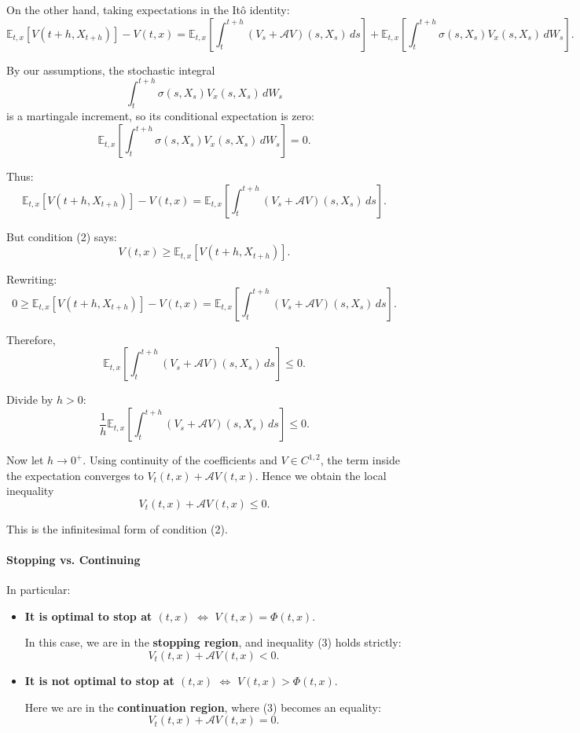\documentclass[12pt,a4paper]{article}
\theoremstyle{definition}
\begin{document}
On the other hand, taking expectations in the Itô identity:
\[
\mathbb{E}_{t,x}[V(t+h, X_{t+h})] - V(t, x) = \mathbb{E}_{t,x}\!\left[\int_t^{t+h} (V_s + \mathcal{A}V)(s, X_s) \, ds\right] + \mathbb{E}_{t,x}\!\left[\int_t^{t+h} \sigma(s, X_s) V_x(s, X_s) \, dW_s\right].
\]

By our assumptions, the stochastic integral
\[
\int_t^{t+h} \sigma(s, X_s) V_x(s, X_s) \, dW_s
\]
is a martingale increment, so its conditional expectation is zero:
\[
\mathbb{E}_{t,x}\!\left[\int_t^{t+h} \sigma(s, X_s) V_x(s, X_s) \, dW_s\right] = 0.
\]

Thus:
\[
\mathbb{E}_{t,x}[V(t+h, X_{t+h})] - V(t, x) = \mathbb{E}_{t,x}\!\left[\int_t^{t+h} (V_s + \mathcal{A}V)(s, X_s) \, ds\right].
\]

But condition (2) says:
\[
V(t, x) \geq \mathbb{E}_{t,x}[V(t+h, X_{t+h})].
\]

Rewriting:
\[
0 \geq \mathbb{E}_{t,x}[V(t+h, X_{t+h})] - V(t, x) = \mathbb{E}_{t,x}\!\left[\int_t^{t+h} (V_s + \mathcal{A}V)(s, X_s) \, ds\right].
\]

Therefore,
\[
\mathbb{E}_{t,x}\!\left[\int_t^{t+h} (V_s + \mathcal{A}V)(s, X_s) \, ds\right] \leq 0.
\]

Divide by $h > 0$:
\[
\frac{1}{h} \mathbb{E}_{t,x}\!\left[\int_t^{t+h} (V_s + \mathcal{A}V)(s, X_s) \, ds\right] \leq 0.
\]

Now let $h \to 0^+$. Using continuity of the coefficients and $V \in C^{1,2}$, the term inside the expectation converges to $V_t(t, x) + \mathcal{A}V(t, x)$. Hence we obtain the local inequality
\[
V_t(t, x) + \mathcal{A}V(t, x) \leq 0. \tag{3}
\]

This is the infinitesimal form of condition (2).

\paragraph{Stopping vs. Continuing}

In particular:

\begin{itemize}
\item \textbf{It is optimal to stop at $(t, x)$} $\iff$ $V(t, x) = \Phi(t, x)$.

In this case, we are in the \textbf{stopping region}, and inequality (3) holds strictly:
\[
V_t(t, x) + \mathcal{A}V(t, x) < 0.
\]

\item \textbf{It is not optimal to stop at $(t, x)$} $\iff$ $V(t, x) > \Phi(t, x)$.

Here we are in the \textbf{continuation region}, where (3) becomes an equality:
\[
V_t(t, x) + \mathcal{A}V(t, x) = 0.
\]
\end{itemize}
\end{document}
